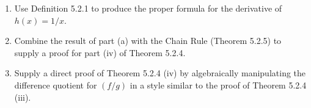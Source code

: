 \documentclass{lew98_solutions}
\begin{document}
\begin{exercise}
\label{ex:5.2.3}
    \begin{enumerate}
        \item Use Definition 5.2.1 to produce the proper formula for the derivative of \( h(x) = 1/x \).

        \item Combine the result of part (a) with the Chain Rule (Theorem 5.2.5) to supply a proof for part (iv) of Theorem 5.2.4.

        \item Supply a direct proof of Theorem 5.2.4 (iv) by algebraically manipulating the difference quotient for \( (f/g) \) in a style similar to the proof of Theorem 5.2.4 (iii).
    \end{enumerate}
\end{exercise}
\end{document}

